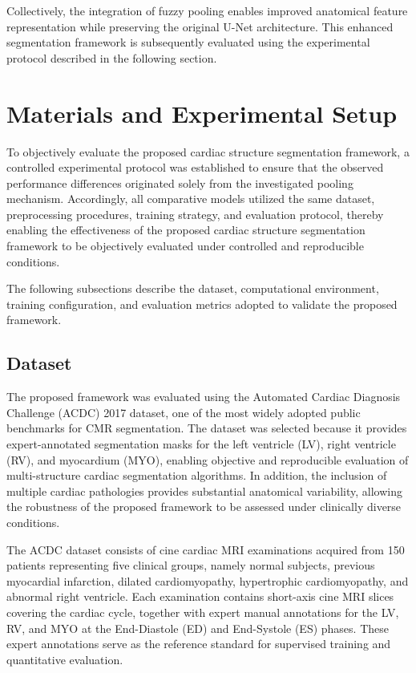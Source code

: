 Collectively, the integration of fuzzy pooling enables improved anatomical feature representation while preserving the original U-Net architecture. This enhanced segmentation framework is subsequently evaluated using the experimental protocol described in the following section.

\section{Materials and Experimental Setup}
\label{sec:ch4-materials}

To objectively evaluate the proposed cardiac structure segmentation framework, a controlled experimental protocol was established to ensure that the observed performance differences originated solely from the investigated pooling mechanism. Accordingly, all comparative models utilized the same dataset, preprocessing procedures, training strategy, and evaluation protocol, thereby enabling the effectiveness of the proposed cardiac structure segmentation framework to be objectively evaluated under controlled and reproducible conditions.

The following subsections describe the dataset, computational environment, training configuration, and evaluation metrics adopted to validate the proposed framework.

\subsection{Dataset}
\label{subsec:ch4-dataset}

The proposed framework was evaluated using the Automated Cardiac Diagnosis Challenge (ACDC) 2017 dataset, one of the most widely adopted public benchmarks for CMR segmentation. The dataset was selected because it provides expert-annotated segmentation masks for the left ventricle (LV), right ventricle (RV), and myocardium (MYO), enabling objective and reproducible evaluation of multi-structure cardiac segmentation algorithms. In addition, the inclusion of multiple cardiac pathologies provides substantial anatomical variability, allowing the robustness of the proposed framework to be assessed under clinically diverse conditions.

The ACDC dataset consists of cine cardiac MRI examinations acquired from 150 patients representing five clinical groups, namely normal subjects, previous myocardial infarction, dilated cardiomyopathy, hypertrophic cardiomyopathy, and abnormal right ventricle. Each examination contains short-axis cine MRI slices covering the cardiac cycle, together with expert manual annotations for the LV, RV, and MYO at the End-Diastole (ED) and End-Systole (ES) phases. These expert annotations serve as the reference standard for supervised training and quantitative evaluation.

